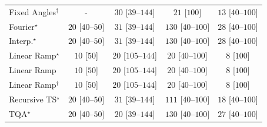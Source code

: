 \begin{tabular}{l|cccc|}
Fixed Angles$^\dagger$ & {\cellcolor[HTML]{000000}} \color[HTML]{F1F1F1} {\cellcolor{white}} \color{black} - & {\cellcolor[HTML]{F3FAF0}} \color[HTML]{000000} $30$ [$39$--$144$] & {\cellcolor[HTML]{F5FBF2}} \color[HTML]{000000} $21$ [$100$] & {\cellcolor[HTML]{F6FCF4}} \color[HTML]{000000} $13$ [$40$--$100$] \\
Fourier$^\star$ & {\cellcolor[HTML]{F5FBF2}} \color[HTML]{000000} $20$ [$40$--$50$] & {\cellcolor[HTML]{F3FAF0}} \color[HTML]{000000} $31$ [$39$--$144$] & {\cellcolor[HTML]{DFF3DA}} \color[HTML]{000000} $130$ [$40$--$100$] & {\cellcolor[HTML]{F4FBF1}} \color[HTML]{000000} $28$ [$40$--$100$] \\
Interp.$^\star$ & {\cellcolor[HTML]{F5FBF2}} \color[HTML]{000000} $20$ [$40$--$50$] & {\cellcolor[HTML]{F3FAF0}} \color[HTML]{000000} $31$ [$39$--$144$] & {\cellcolor[HTML]{DFF3DA}} \color[HTML]{000000} $130$ [$40$--$100$] & {\cellcolor[HTML]{F4FBF1}} \color[HTML]{000000} $28$ [$40$--$100$] \\
Linear Ramp$^\star$ & {\cellcolor[HTML]{F7FCF5}} \color[HTML]{000000} $10$ [$50$] & {\cellcolor[HTML]{F5FBF2}} \color[HTML]{000000} $20$ [$105$--$144$] & {\cellcolor[HTML]{F5FBF2}} \color[HTML]{000000} $20$ [$40$--$100$] & {\cellcolor[HTML]{F7FCF5}} \color[HTML]{000000} $8$ [$100$] \\
Linear Ramp & {\cellcolor[HTML]{F7FCF5}} \color[HTML]{000000} $10$ [$50$] & {\cellcolor[HTML]{F5FBF2}} \color[HTML]{000000} $20$ [$105$--$144$] & {\cellcolor[HTML]{F5FBF2}} \color[HTML]{000000} $20$ [$40$--$100$] & {\cellcolor[HTML]{F7FCF5}} \color[HTML]{000000} $8$ [$100$] \\
Linear Ramp$^\dagger$ & {\cellcolor[HTML]{F7FCF5}} \color[HTML]{000000} $10$ [$50$] & {\cellcolor[HTML]{F5FBF2}} \color[HTML]{000000} $20$ [$105$--$144$] & {\cellcolor[HTML]{F5FBF2}} \color[HTML]{000000} $20$ [$40$--$100$] & {\cellcolor[HTML]{F7FCF5}} \color[HTML]{000000} $8$ [$100$] \\
Recursive TS$^\star$ & {\cellcolor[HTML]{F5FBF2}} \color[HTML]{000000} $20$ [$40$--$50$] & {\cellcolor[HTML]{F3FAF0}} \color[HTML]{000000} $31$ [$39$--$144$] & {\cellcolor[HTML]{E5F5E0}} \color[HTML]{000000} $111$ [$40$--$100$] & {\cellcolor[HTML]{F5FBF3}} \color[HTML]{000000} $18$ [$40$--$100$] \\
TQA$^\star$ & {\cellcolor[HTML]{F5FBF2}} \color[HTML]{000000} $20$ [$40$--$50$] & {\cellcolor[HTML]{F5FBF2}} \color[HTML]{000000} $20$ [$39$--$144$] & {\cellcolor[HTML]{DFF3DA}} \color[HTML]{000000} $130$ [$40$--$100$] & {\cellcolor[HTML]{F4FBF1}} \color[HTML]{000000} $27$ [$40$--$100$] \\

\end{tabular}
